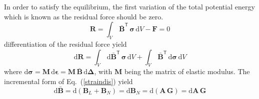 In order to satisfy the equilibrium, the first variation of the total potential energy which is known as the residual force should be zero. 
\begin{equation}
\mathbf{R} = \int_{V} \, \bar{\mathbf{B}}^{\mathsf{T}} \, \boldsymbol{\sigma} \, \mathrm{d} V - \mathbf{F} = 0
\label{residual}
\end{equation}
differentiation of the residual force yield 
\begin{equation}
\mathrm{d} \mathbf{R} = \int_{V} \, \mathrm{d} \bar{\mathbf{B}}^{\mathsf{T}} \, \boldsymbol{\sigma} \, \mathrm{d} V + \int_{V} \, \bar{\mathbf{B}}^{\mathsf{T}} \, \mathrm{d} \boldsymbol{\sigma} \, \mathrm{d} V 
\label{diffresidual}
\end{equation}
where $\mathrm{d} \boldsymbol{\sigma} = \mathbf{M} \, \mathrm{d} \boldsymbol{\epsilon} = \mathbf{M} \, \bar{\mathbf{B}} \, \mathrm{d} \boldsymbol{\Delta}$, with $\mathbf{M}$ being the matrix of elastic modulus. 
The incremental form of  Eq.~(\ref{straindis}) yield
\begin{equation}
\mathrm{d} \bar{\mathbf{B}} = \mathrm{d} \left(\mathbf{B}_L + \mathbf{B}_N \right) = \mathrm{d} \mathbf{B}_N = \mathrm{d} (\mathbf{A} \, \mathbf{G}) = \mathrm{d} \mathbf{A} \, \mathbf{G}
\end{equation} 

